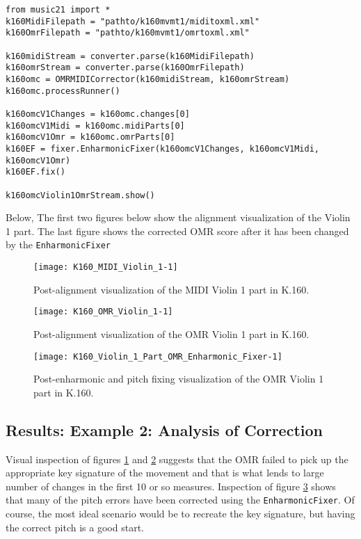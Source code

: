 \begin{verbatim}
from music21 import *
k160MidiFilepath = "pathto/k160mvmt1/miditoxml.xml"
k160OmrFilepath = "pathto/k160mvmt1/omrtoxml.xml"
         
k160midiStream = converter.parse(k160MidiFilepath)
k160omrStream = converter.parse(k160OmrFilepath)
k160omc = OMRMIDICorrector(k160midiStream, k160omrStream)
k160omc.processRunner()
        
k160omcV1Changes = k160omc.changes[0]
k160omcV1Midi = k160omc.midiParts[0]
k160omcV1Omr = k160omc.omrParts[0]
k160EF = fixer.EnharmonicFixer(k160omcV1Changes, k160omcV1Midi, k160omcV1Omr)
k160EF.fix()

k160omcViolin1OmrStream.show()
\end{verbatim}

Below, The first two figures below show the alignment visualization of the Violin 1 part. The last figure shows the corrected OMR score after it has been changed by the \texttt{EnharmonicFixer}

\begin{figure}[H]
\centering
\texttt{[image: K160\_MIDI\_Violin\_1-1]}
\caption{Post-alignment visualization of the MIDI Violin 1 part in K.160.}
\label{fig:k160postalignv1midi}
\end{figure}

\begin{figure}[H]
\centering
\texttt{[image: K160\_OMR\_Violin\_1-1]}
\caption{Post-alignment visualization of the OMR Violin 1 part in K.160.}
\label{fig:k160postalignv1omr}
\end{figure}

\begin{figure}[H]
\centering
\texttt{[image: K160\_Violin\_1\_Part\_OMR\_Enharmonic\_Fixer-1]}
\caption{Post-enharmonic and pitch fixing visualization of the OMR Violin 1 part in K.160.}
\label{fig:k160postfixv1}
\end{figure}

\subsection{Results: Example 2: Analysis of Correction}
Visual inspection of figures \ref{fig:k160postalignv1midi} and \ref{fig:k160postalignv1omr} suggests that the OMR failed to pick up the appropriate key signature of the movement and that is what lends to large number of changes in the first 10 or so measures. Inspection of figure \ref{fig:k160postfixv1} shows that many of the pitch errors have been corrected using the \texttt{EnharmonicFixer}. Of course, the most ideal scenario would be to recreate the key signature, but having the correct pitch is a good start. 

